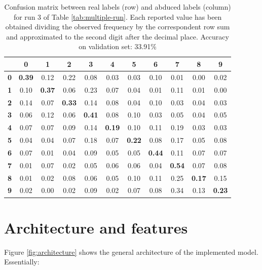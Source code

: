 \begin{table}[H]
  \caption{Confusion matrix between real labels (row) and abduced labels (column) for run 3 of Table \ref{tab:multiple-run}. Each reported value has been obtained dividing the observed frequency by the correspondent row sum and approximated to the second digit after the decimal place. Accuracy on validation set: 33.91\%}
  \label{tab:confusion-matrix-3}
  \centering
  \begin{tabular}{ccccccccccc}  
						& \textbf{0} & \textbf{1} & \textbf{2} & \textbf{3} & \textbf{4} & \textbf{5} & \textbf{6} & \textbf{7} & \textbf{8} & \textbf{9}\\
	\hline
	\textbf{0}			& \textbf{0.39} & 0.12 & 0.22 & 0.08 & 0.03 & 0.03 & 0.10 & 0.01 & 0.00 & 0.02  \\
	\hline
	\textbf{1}			& 0.10 & \textbf{0.37} & 0.06 & 0.23 & 0.07 & 0.04 & 0.01 & 0.11 & 0.01 & 0.00  \\
	\hline
	\textbf{2}			& 0.14 & 0.07 & \textbf{0.33} & 0.14 & 0.08 & 0.04 & 0.10 & 0.03 & 0.04 & 0.03  \\
	\hline
	\textbf{3} 			& 0.06 & 0.12 & 0.06 & \textbf{0.41} & 0.08 & 0.10 & 0.03 & 0.05 & 0.04 & 0.05  \\
	\hline
	\textbf{4} 			& 0.07 & 0.07 & 0.09 & 0.14 & \textbf{0.19} & 0.10 & 0.11 & 0.19 & 0.03 & 0.03  \\
	\hline
	\textbf{5} 			& 0.04 & 0.04 & 0.07 & 0.18 & 0.07 & \textbf{0.22} & 0.08 & 0.17 & 0.05 & 0.08  \\
	\hline
	\textbf{6} 			& 0.07 & 0.01 & 0.04 & 0.09 & 0.05 & 0.05 & \textbf{0.44} & 0.11 & 0.07 & 0.07  \\
	\hline
	\textbf{7} 			& 0.01 & 0.07 & 0.02 & 0.05 & 0.06 & 0.06 & 0.04 & \textbf{0.54} & 0.07 & 0.08  \\
	\hline
	\textbf{8} 			& 0.01 & 0.02 & 0.08 & 0.06 & 0.05 & 0.10 & 0.11 & 0.25 & \textbf{0.17} & 0.15  \\
	\hline
	\textbf{9} 			& 0.02 & 0.00 & 0.02 & 0.09 & 0.02 & 0.07 & 0.08 & 0.34 & 0.13 & \textbf{0.23}  \\
	\bottomrule
	\end{tabular}
\end{table}

\section{Architecture and features}
\label{arch-and-feat}
Figure \ref{fig:architecture} shows the general architecture of the implemented model. Essentially:

